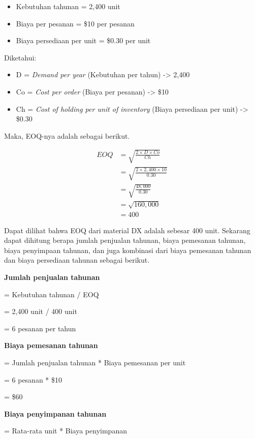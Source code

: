 \begin{itemize}
	\item Kebutuhan tahunan = 2,400 unit
	\item Biaya per pesanan = \${10} per pesanan
	\item Biaya persediaan per unit = \${0.30} per unit
\end{itemize}

Diketahui:
\begin{itemize}
	\item D = \textit{Demand per year} (Kebutuhan per tahun) -> 2,400
	\item Co = \textit{Cost per order} (Biaya per pesanan) -> \${10}
	\item Ch = \textit{Cost of holding per unit of inventory} (Biaya persediaan per unit) -> \${0.30}
\end{itemize}

Maka, EOQ-nya adalah sebagai berikut.

\begin{equation}
    \begin{split}
		EOQ
		&= \sqrt{\frac{2 \times D \times Co}{Ch}} \\
		&= \sqrt{\frac{2 \times 2,400 \times 10}{0.30}} \\
		&= \sqrt{\frac{48,000}{0.30}} \\
		&= \sqrt{160,000} \\
		&= 400
    \end{split}
\end{equation}

Dapat dilihat bahwa EOQ dari material DX adalah sebesar 400 unit. Sekarang dapat dihitung berapa jumlah penjualan tahunan, biaya pemesanan tahunan, biaya penyimpaan tahunan, dan juga kombinasi dari biaya pemesanan tahunan dan biaya persediaan tahunan sebagai berikut.

\textbf{Jumlah penjualan tahunan}

= Kebutuhan tahunan / EOQ

= 2,400 unit / 400 unit

= 6 pesanan per tahun

\textbf{Biaya pemesanan tahunan}

= Jumlah penjualan tahunan * Biaya pemesanan per unit

= 6 pesanan * \${10}

= \${60}

\textbf{Biaya penyimpanan tahunan}

= Rata-rata unit * Biaya penyimpanan

